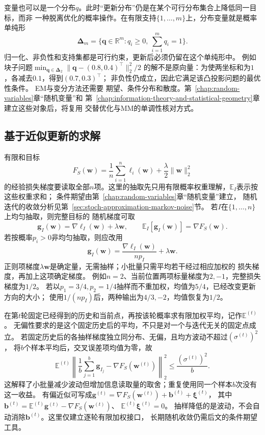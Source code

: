 变量也可以是一个分布$q$。此时“更新分布”仍是在某个可行分布集合上降低同一目标，而非
一种脱离优化的概率操作。在有限支持$\{1,\ldots,m\}$上，分布变量就是概率单纯形
\[
  \bm{\Delta}_m
  =\{\bm{q}\in\mathbb{R}^m:q_i\geq0,\ \sum_{i=1}^m q_i=1\}.
\]
归一化、非负性和支持集都是可行约束，更新后必须仍留在这个单纯形中。
例如块子问题$\min_{\bm q\in\bm\Delta_2}\|\bm q-(0.8,0.4)^\top\|_2^2/2$
的解不是原向量：为使两坐标和为$1$，各减去$0.1$，得到$(0.7,0.3)^\top$；
非负性仍成立，因此它满足该凸投影问题的最优性条件。
EM与变分方法还需要
期望、条件分布和散度。第~\ref{chap:random-variables}章“随机变量”和
第~\ref{chap:information-theory-and-statistical-geometry}章建立这些对象后，将复用
交替优化与MM的单调性核对方式。

\subsection{基于近似更新的求解}
\label{sec:opt-stochastic-gradient-stability}

有限和目标
\[
  F_S(\bm{w})=\frac1n\sum_{i=1}^n\ell_i(\bm{w})
  +\frac{\lambda}{2}\lVert\bm{w}\rVert_2^2
\]
的经验损失梯度要读取全部$n$项。这里的抽取先只用有限概率权重理解，$\mathbb E_I$表示按这些权重求和；
条件期望由第~\ref{chap:random-variables}章“随机变量”建立，
随机迭代的收敛分析见第~\ref{sec:stoch-approximation-markov-noise}节。
若$I$在$\{1,\ldots,n\}$上均匀抽取，则完整目标的
随机梯度可取
\[
  \bm{g}_I(\bm{w})
  =\nabla\ell_I(\bm{w})+\lambda\bm{w},\qquad
  \mathbb{E}_I[\bm{g}_I(\bm{w})]
  =\nabla F_S(\bm{w}).
\]
若按概率$p_i>0$非均匀抽取，则应改用
\[
  \bm{g}_I(\bm{w})
  =\frac{\nabla\ell_I(\bm{w})}{np_I}+\lambda\bm{w}.
\]
正则项梯度$\lambda\bm{w}$是确定量，无需抽样；小批量只需平均若干经过相应加权的
损失梯度，再加上这项确定梯度。
例如$n=2$、当前位置两项标量梯度为$2,-1$，完整损失梯度为$1/2$。
若以$p_1=3/4,p_2=1/4$抽样而不重加权，均值为$5/4$，已经改变更新方向的大小；
使用$1/(np_I)$后，两种输出为$4/3,-2$，均值恢复为$1/2$。

在第$t$轮固定已经得到的历史和当前点，再按该轮概率求有限加权平均，记作$\mathbb E^{(t)}$。
无偏性要求的是这个固定历史后的平均，不只是对一个与迭代无关的固定点成立。
若固定历史后的各抽样梯度独立同分布、无偏，且均方波动不超过$(\sigma^{(t)})^2$，
将$b$个样本平均后，交叉误差项均值为零，故
\[
 \mathbb E^{(t)}\left\|\frac1b\sum_{j=1}^b\bm g_{I_j}
             -\nabla F_S(\bm w^{(t)})\right\|_2^2
 \leq\frac{(\sigma^{(t)})^2}{b}.
\]
这解释了小批量减少波动但增加信息读取量的取舍；重复使用同一个样本$b$次没有这一收益。
有偏近似可写成$\bm g^{(t)}=\nabla F_S(\bm w^{(t)})+\bm b^{(t)}+\bm\xi^{(t)}$，
其中$\bm b^{(t)}=\mathbb E^{(t)}\bm g^{(t)}-\nabla F_S(\bm w^{(t)})$、
$\mathbb E^{(t)}\bm\xi^{(t)}=0$。
抽样降低的是波动，不会自动消除$\bm b^{(t)}$。这里仅建立逐轮有限加权接口，
长期随机收敛仍需后文的条件期望工具。

